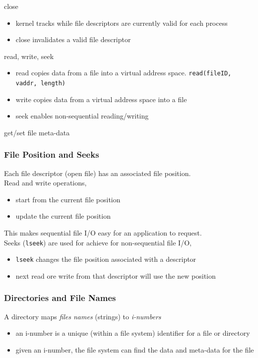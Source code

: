 \documentclass[12pt]{article}
\theoremstyle{plain}
\theoremstyle{definition}
\begin{document}
close
\begin{itemize}
  \item kernel tracks while file descriptors are currently valid for each process
  \item close invalidates a valid file descriptor
\end{itemize}

read, write, seek
\begin{itemize}
  \item read copies data from a file into a virtual address space. \texttt{read(fileID, vaddr, length)}
  \item write copies data from a virtual address space into a file
  \item seek enables non-sequential reading/writing
\end{itemize}

get/set file meta-data

\subsubsection{File Position and Seeks}
Each file descriptor (open file) has an associated file position. \\

Read and write operations,
\begin{itemize}
  \item start from the current file position
  \item update the current file position
\end{itemize}

This makes sequential file I/O easy for an application to request. \\

Seeks (\texttt{lseek}) are used for achieve for non-sequential file I/O,
\begin{itemize}
  \item \texttt{lseek} changes the file position associated with a descriptor
  \item next read ore write from that descriptor will use the new position
\end{itemize}

\subsubsection{Directories and File Names}
A directory maps \emph{files names} (strings) to \emph{i-numbers}
\begin{itemize}
  \item an i-number is a unique (within a file system) identifier for a file or directory
  \item given an i-number, the file system can find the data and meta-data for the file
\end{itemize}
\end{document}
